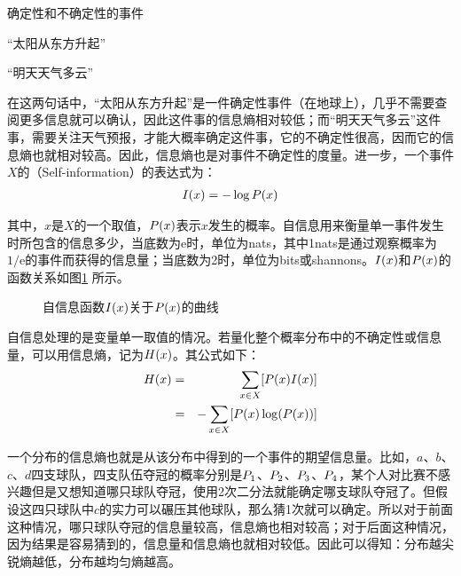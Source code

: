 \begin{example}
确定性和不确定性的事件

\qquad\qquad\quad“太阳从东方升起”

\qquad\qquad\quad“明天天气多云”
\label{eg:2-1}
\end{example}

\parinterval 在这两句话中，“太阳从东方升起”是一件确定性事件（在地球上），几乎不需要查阅更多信息就可以确认，因此这件事的信息熵相对较低；而“明天天气多云”这件事，需要关注天气预报，才能大概率确定这件事，它的不确定性很高，因而它的信息熵也就相对较高。因此，信息熵也是对事件不确定性的度量。进一步，一个事件$X$的{\small{}}（Self-information）的表达式为：
\begin{eqnarray}
{I}(x)=-\log {P}(x)
\label{eq:2-13}
\end{eqnarray}

\noindent 其中，$x$是$X$的一个取值，${P}(x)$表示$x$发生的概率。自信息用来衡量单一事件发生时所包含的信息多少，当底数为e时，单位为nats，其中1nats是通过观察概率为$1/\textrm{e}$的事件而获得的信息量；当底数为2时，单位为bits或shannons。${I}(x)$和${P}(x)$的函数关系如图\ref{fig:2-4} 所示。

\begin{figure}[htp]
\centering

\caption{自信息函数${I}(x)$关于${P}(x)$的曲线}
\label{fig:2-4}
\end{figure}

\parinterval 自信息处理的是变量单一取值的情况。若量化整个概率分布中的不确定性或信息量，可以用信息熵，记为${H}(x)$。其公式如下：
\begin{eqnarray}
{H}(x) & = & \sum_{x \in X}[ {P}(x) {I}(x)] \nonumber \\
              & = & - \sum_{x \in X } [{P}(x)\log({P}(x)) ]
\label{eq:2-14}
\end{eqnarray}

\parinterval 一个分布的信息熵也就是从该分布中得到的一个事件的期望信息量。比如，$a$、$b$、$c$、$d$四支球队，四支队伍夺冠的概率分别是${P}_1$、${P}_2$、${P}_3$、${P}_4$，某个人对比赛不感兴趣但是又想知道哪只球队夺冠，使用2次二分法就能确定哪支球队夺冠了。但假设这四只球队中$c$的实力可以碾压其他球队，那么猜1次就可以确定。所以对于前面这种情况，哪只球队夺冠的信息量较高，信息熵也相对较高；对于后面这种情况，因为结果是容易猜到的，信息量和信息熵也就相对较低。因此可以得知：分布越尖锐熵越低，分布越均匀熵越高。

